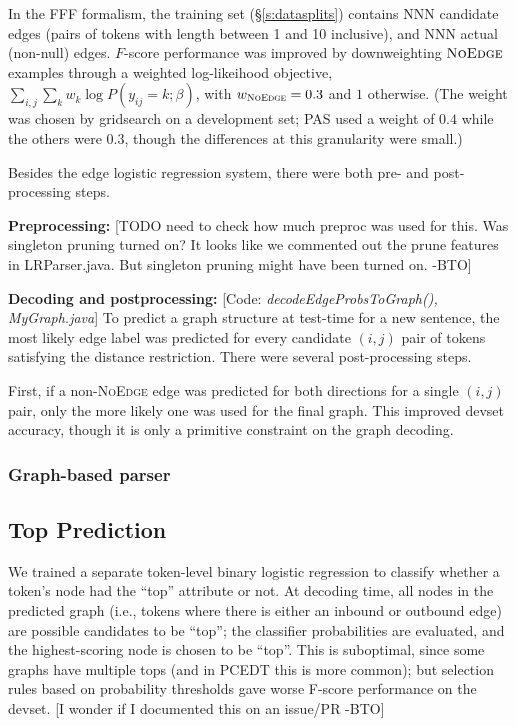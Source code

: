 \documentclass[11pt]{article}
\newcommand{\bocomment}[1]{\textcolor{Bittersweet}{[#1 -BTO]}}
\newcommand{\codenote}[1]{\textcolor{PineGreen}{[Code: \emph{#1}]}}
\begin{document}
In the FFF formalism, the training set (\S\ref{s:datasplits})
contains NNN candidate edges (pairs of tokens with length between 1 and 10 inclusive),
and NNN actual (non-null) edges.  $F$-score performance was improved by downweighting $\textsc{NoEdge}$ examples through a weighted log-likeihood objective,
$\sum_{i,j} \sum_k w_k \log P(y_{ij}=k;\beta)$,
with $w_{\textsc{NoEdge}}=0.3$ and $1$ otherwise.  
(The weight was chosen by gridsearch on a development set; 
PAS used a weight of $0.4$ while the others were $0.3$, though the differences at this granularity were small.)

Besides the edge logistic regression system, there were both pre- and post-processing steps.

\textbf{Preprocessing:}
\bocomment{TODO need to check how much preproc was used for this.  Was singleton pruning turned on?  It looks like we commented out the prune features in LRParser.java.  But singleton pruning might have been turned on.}

\textbf{Decoding and postprocessing:}
\codenote{decodeEdgeProbsToGraph(), MyGraph.java}
To predict a graph structure at test-time for a new sentence,
the most likely edge label was predicted for every candidate $(i,j)$ pair of tokens satisfying the distance restriction.  There were several post-processing steps.

First, if a non-\textsc{NoEdge} edge was predicted for both directions for a single $(i,j)$ pair, only the more likely one was used for the final graph.  This improved devset accuracy, though it is only a primitive constraint on the graph decoding.



\subsubsection{Graph-based parser} \label{s:graphparser}

\subsection{Top Prediction} \label{s:top_model}

We trained a separate token-level binary logistic regression to classify
whether a token's node had the ``top'' attribute or not.
At decoding time, all nodes in the predicted graph (i.e., tokens where there is
either an inbound or outbound edge) are possible candidates to be ``top'';
the classifier probabilities are evaluated, and the highest-scoring node is
chosen to be ``top''.
This is suboptimal, since some graphs have multiple tops (and in PCEDT this is
more common);
but selection rules based on probability thresholds gave worse F-score
performance on the devset. \bocomment{I wonder if I documented this on an issue/PR}
\end{document}
